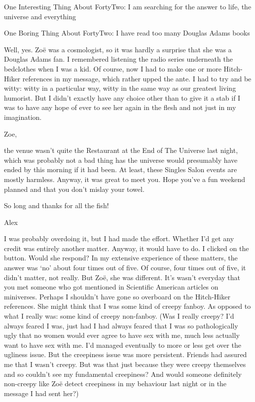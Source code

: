 One Interesting Thing About FortyTwo: I am searching for the answer
to life, the universe and everything

One Boring Thing About FortyTwo: I have read too many Douglas Adams
books

Well, yes. Zoë was a cosmologist, so it was hardly a surprise
that she was a Douglas Adams fan. I remembered listening the radio
series underneath the bedclothes when I was a kid. Of course, now I
had to make one or more {\twelvesl Hitch-Hiker\/} references in my
message, which rather upped the ante. I had to try and be witty:
witty in a particular way, witty in the same way as our greatest
living humorist. But I didn't exactly have any choice other than to
give it a stab if I was to have any hope of ever to see her again in
the flesh and not just in my imagination.

\startmessage
Zoe,

the venue wasn't quite the Restaurant at the End of The Universe
last night, which was probably not a bad thing has the universe
would presumably have ended by this morning if it had been. At
least, these Singles Salon events are mostly harmless. Anyway, it
was great to meet you. Hope you've a fun weekend planned and that
you don't mislay your towel.

So long and thanks for all the fish!

Alex
\stopmessage

I was probably overdoing it, but I had made the effort. Whether I'd
get any credit was entirely another matter. Anyway, it would have to
do. I clicked on the  button. Would she respond? In my extensive
experience of these matters, the answer was `no' about four times
out of five. Of course, four times out of five, it didn't matter,
not really. But Zoë, she was different. It's wasn't everyday
that you met someone who got mentioned in {\twelvesl Scientific
American\/} articles on miniverses. Perhaps I shouldn't have gone so
overboard on the {\twelvesl Hitch-Hiker\/} references. She might
think that I was some kind of creepy fanboy. As opposed to what I
really was: some kind of creepy non-fanboy. (Was I really creepy?
I'd always feared I was, just had I had always feared that I was so
pathologically ugly that no women would ever agree to have sex with
me, much less actually {\twelveit want\/} to have sex with me. I'd
managed eventually to more or less get over the ugliness issue. But
the creepiness issue was more persistent. Friends had assured me
that I wasn't creepy. But was that just because they were creepy
themselves and so couldn't see my fundamental creepiness? And would
someone definitely non-creepy like Zoë detect creepiness in my
behaviour last night or in the message I had sent her?)

